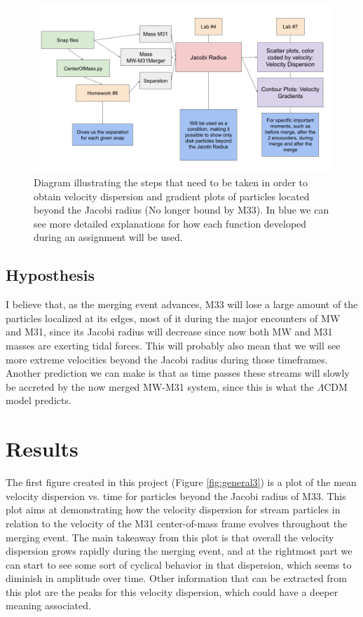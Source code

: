 \documentclass[linenumbers,trackchanges,twocolumn]{aastex7}
\begin{document}
\begin{figure}
    \includegraphics[width=\linewidth]{DiagramRA.png}
    \caption{Diagram illustrating the steps that need to be taken in order to obtain velocity dispersion and gradient plots of particles located beyond the Jacobi radius (No longer bound by M33). In blue we can see more detailed explanations for how each function developed during an assignment will be used.
    \label{fig:general2}}
\end{figure}


\subsection{Hyposthesis}

I believe that, as the merging event advances, M33 will lose a large amount of the particles localized at its edges, most of it during the major encounters of MW and M31, since its Jacobi radius will decrease since now both MW and M31 masses are exerting tidal forces. This will probably also mean that we will see more extreme velocities beyond the Jacobi radius during those timeframes. Another prediction we can make is that as time passes these streams will slowly be accreted by the now merged MW-M31 system, since this is what the $\Lambda$CDM model predicts.

\section{Results} \label{sec:results}

The first figure created in this project (Figure \ref{fig:general3}) is a plot of the mean velocity dispersion vs. time for particles beyond the Jacobi radius of M33. This plot aims at demonstrating how the velocity dispersion for stream particles in relation to the velocity of the M31 center-of-mass frame evolves throughout the merging event. The main takeaway from this plot is that overall the velocity dispersion grows rapidly during the merging event, and at the rightmost part we can start to see some sort of cyclical behavior in that dispersion, which seems to diminish in amplitude over time. Other information that can be extracted from this plot are the peaks for this velocity dispersion, which could have a deeper meaning associated.
\end{document}
